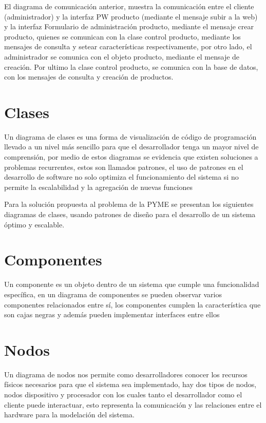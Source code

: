 El diagrama de comunicación anterior, muestra la comunicación entre el cliente (administrador) y la interfaz PW producto (mediante el mensaje subir a la web) y la interfaz Formulario de administración producto, mediante el mensaje crear producto, quienes se comunican con la clase control producto, mediante los mensajes de consulta y setear características respectivamente, por otro lado, el administrador se comunica con el objeto producto, mediante el mensaje de creación. Por ultimo la clase control producto, se comunica con la base de datos, con los mensajes de consulta y creación de productos.

\newpage

\section{Clases}
Un diagrama de clases es una forma de visualización de código de programación llevado a un nivel más sencillo para que el desarrollador tenga un mayor nivel de comprensión, por medio de estos diagramas se evidencia que existen soluciones a problemas recurrentes, estos son llamados patrones, el uso de patrones en el desarrollo de software no solo optimiza el funcionamiento del sistema si no permite la escalabilidad y la agregación de nuevas funciones 

Para la solución propuesta al problema de la PYME  se presentan los siguientes diagramas de clases, usando patrones de diseño para el desarrollo de un sistema óptimo y escalable.

\newpage

\section{Componentes}
Un componente es un objeto dentro de un sistema que cumple una funcionalidad específica, en un diagrama de componentes se pueden observar varios componentes relacionados entre sí, los componentes cumplen la característica que son cajas negras y además pueden implementar interfaces entre ellos

\newpage

\section{Nodos}
Un diagrama de nodos nos permite como desarrolladores conocer los recursos físicos necesarios para que el sistema sea implementado, hay dos tipos de nodos, nodos dispositivo y procesador con los cuales tanto el desarrollador como el cliente puede interactuar, esto representa la comunicación y las relaciones entre el hardware para la modelación del sistema.

